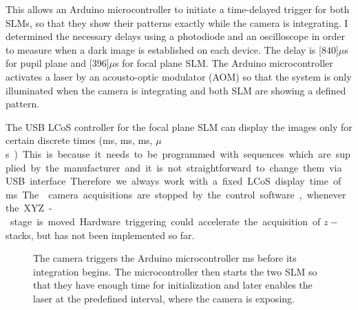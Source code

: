 This allows an Arduino microcontroller to initiate a time-delayed
trigger for both SLMs, so that they show their patterns exactly while
the camera is integrating. I determined the necessary delays using a
photodiode and an oscilloscope in order to measure when a dark image
is established on each device. The delay is \unit[$840$]{$\mu$s} for
pupil plane and \unit[$396$]{$\mu$s} for focal plane SLM. The Arduino
microcontroller activates a laser by an acousto-optic modulator (AOM)
so that the system is only illuminated when the camera is integrating
and both SLM are showing a defined pattern.  



The  USB LCoS controller for the
focal plane SLM can display the images only for certain discrete times
(\unit[20]{ms}, \unit[10]{ms}, \unit[5]{ms}, \unit[200]{$\mu$s}).
This is because it needs to be programmed with sequences which are
supplied by the manufacturer and it is not straightforward to change
them via USB interface. Therefore we always work with a fixed LCoS
display time of \unit[20]{ms}.

The  camera acquisitions are stopped
by the control software, whenever the XYZ-stage is moved. Hardware
triggering could accelerate the acquisition of $z-$stacks, but has not
been implemented so far.

\begin{figure}[H]
 \centering
 \caption{The camera triggers the Arduino microcontroller \unit[1]{ms}
   before its integration begins. The microcontroller then starts the
   two SLM so that they have enough time for initialization and later
   enables the laser at the predefined interval, where the camera is
   exposing.}
 \label{fig:memi-electronics}
\end{figure}












